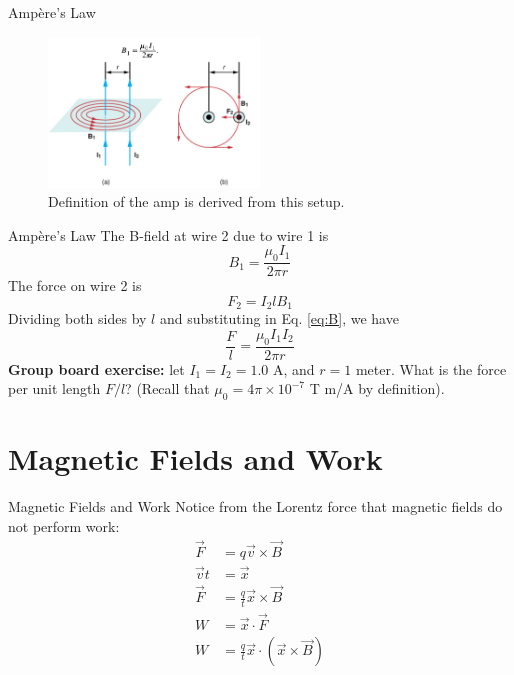 \documentclass{beamer}
\begin{document}
\begin{frame}{Amp\`{e}re's Law}
\begin{figure}
\centering
\includegraphics[width=0.5\textwidth]{figures/amp.png}
\caption{\label{fig:amp} Definition of the amp is derived from this setup.}
\end{figure}
\end{frame}

\begin{frame}{Amp\`{e}re's Law}
The B-field at wire 2 due to wire 1 is
\begin{equation}
B_1 = \frac{\mu_0 I_1}{2\pi r}
\label{eq:B}
\end{equation}
The force on wire 2 is 
\begin{equation}
F_2 = I_2 l B_1
\end{equation}
Dividing both sides by $l$ and substituting in Eq. \ref{eq:B}, we have
\begin{equation}
\frac{F}{l} = \frac{\mu_0 I_1 I_2}{2\pi r}
\end{equation}
\textbf{Group board exercise:} let $I_1 = I_2 = 1.0$ A, and $r = 1$ meter.  What is the force per unit length $F/l$?  (Recall that $\mu_0 = 4\pi \times 10^{-7}$ T m/A by definition).
\end{frame}

\section{Magnetic Fields and Work}

\begin{frame}{Magnetic Fields and Work}
Notice from the Lorentz force that magnetic fields do not perform work:
\begin{align}
\vec{F} &= q \vec{v} \times \vec{B} \\ 
\vec{v} t &= \vec{x} \\
\vec{F} &= \frac{q}{t} \vec{x} \times \vec{B} \\
W &= \vec{x} \cdot \vec{F} \\
W &= \frac{q}{t} \vec{x} \cdot \left( \vec{x} \times \vec{B} \right)
\end{align}
\end{frame}
\end{document}
